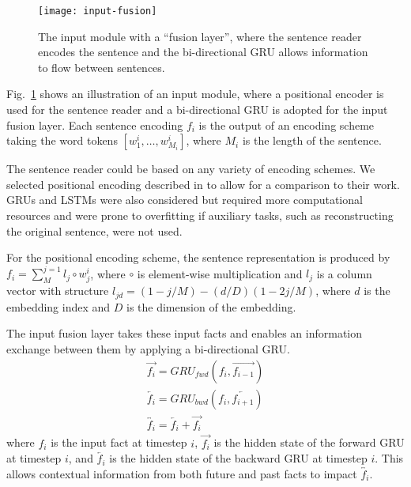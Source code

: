 \documentclass{article}
\begin{document}
\begin{figure}
\centering
\texttt{[image: input-fusion]}
\vspace{-0.3cm}
\caption{The input module with a ``fusion layer'', where the sentence reader encodes the sentence and the bi-directional GRU allows information to flow between sentences.}
\vspace{-0.3cm}
\label{fig:fusion}
\end{figure}

Fig.~\ref{fig:fusion} shows an illustration of an input module, where a positional encoder is used for the sentence reader and a bi-directional GRU is adopted for the input fusion layer.
Each sentence encoding $f_i$ is the output of an encoding scheme taking the word tokens $[w^i_1, \hdots, w^i_{M_i}]$, where $M_i$ is the length of the sentence.

The sentence reader could be based on any variety of encoding schemes. We selected positional encoding described in \citet{Sukhbaatar2015} to allow for a comparison to their work.
GRUs and LSTMs were also considered but required more computational resources and were prone to overfitting if auxiliary tasks, such as reconstructing the original sentence, were not used.

For the positional encoding scheme, the sentence representation is produced by $f_i = \sum^{j=1}_M l_j \circ w^i_j$, where $\circ$ is element-wise multiplication and $l_j$ is a column vector with structure $l_{jd} = (1 - j / M) - (d / D) (1 - 2j / M)$, where $d$ is the embedding index and $D$ is the dimension of the embedding.



The input fusion layer takes these input facts and enables an information exchange between them by applying a bi-directional GRU.
\begin{eqnarray}
\overrightarrow{f_i} = GRU_{fwd}(f_i, \overrightarrow{f_{i-1}}) \\
\overleftarrow{f_{i}} = GRU_{bwd}(f_{i}, \overleftarrow{f_{i+1}}) \\
\overleftrightarrow{f_i} = \overleftarrow{f_i} + \overrightarrow{f_i}
\end{eqnarray}
where $f_i$ is the input fact at timestep $i$, $ \overrightarrow{f_i}$ is the hidden state of the forward GRU at timestep $i$, and $\overleftarrow{f_i}$ is the hidden state of the backward GRU at timestep $i$.
This allows contextual information from both future and past facts to impact $\overleftrightarrow{f_i}$.
\end{document}
